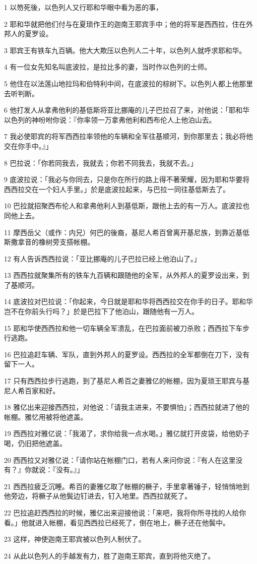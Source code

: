 \par 1 以笏死後，以色列人又行耶和华眼中看为恶的事，
\par 2 耶和华就把他们付与在夏琐作王的迦南王耶宾手中；他的将军是西西拉，住在外邦人的夏罗设。
\par 3 耶宾王有铁车九百辆。他大大欺压以色列人二十年，以色列人就呼求耶和华。
\par 4 有一位女先知名叫底波拉，是拉比多的妻，当时作以色列的士师。
\par 5 他住在以法莲山地拉玛和伯特利中间，在底波拉的棕树下。以色列人都上他那里去听判断。
\par 6 他打发人从拿弗他利的基低斯将亚比挪庵的儿子巴拉召了来，对他说：「耶和华以色列的神吩咐你说：『你率领一万拿弗他利和西布伦人上他泊山去。
\par 7 我必使耶宾的将军西西拉率领他的车辆和全军往基顺河，到你那里去；我必将他交在你手中。』」
\par 8 巴拉说：「你若同我去，我就去；你若不同我去，我就不去。」
\par 9 底波拉说：「我必与你同去，只是你在所行的路上得不著荣耀，因为耶和华要将西西拉交在一个妇人手里。」於是底波拉起来，与巴拉一同往基低斯去了。
\par 10 巴拉就招聚西布伦人和拿弗他利人到基低斯，跟他上去的有一万人。底波拉也同他上去。
\par 11 摩西岳父（或作：内兄）何巴的後裔，基尼人希百曾离开基尼族，到靠近基低斯撒拿音的橡树旁支搭帐棚。
\par 12 有人告诉西西拉说：「亚比挪庵的儿子巴拉已经上他泊山了。」
\par 13 西西拉就聚集所有的铁车九百辆和跟随他的全军，从外邦人的夏罗设出来，到了基顺河。
\par 14 底波拉对巴拉说：「你起来，今日就是耶和华将西西拉交在你手的日子。耶和华岂不在你前头行吗？」於是巴拉下了他泊山，跟随他有一万人。
\par 15 耶和华使西西拉和他一切车辆全军溃乱，在巴拉面前被刀杀败；西西拉下车步行逃跑。
\par 16 巴拉追赶车辆、军队，直到外邦人的夏罗设。西西拉的全军都倒在刀下，没有留下一人。
\par 17 只有西西拉步行逃跑，到了基尼人希百之妻雅亿的帐棚，因为夏琐王耶宾与基尼人希百家和好。
\par 18 雅亿出来迎接西西拉，对他说：「请我主进来，不要惧怕」；西西拉就进了他的帐棚。雅忆用被将他遮盖。
\par 19 西西拉对雅亿说：「我渴了，求你给我一点水喝。」雅亿就打开皮袋，给他奶子喝，仍旧把他遮盖。
\par 20 西西拉又对雅亿说：「请你站在帐棚门口，若有人来问你说：『有人在这里没有？』你就说：『没有。』」
\par 21 西西拉疲乏沉睡。希百的妻雅亿取了帐棚的橛子，手里拿著锤子，轻悄悄地到他旁边，将橛子从他鬓边钉进去，钉入地里。西西拉就死了。
\par 22 巴拉追赶西西拉的时候，雅亿出来迎接他说：「来吧，我将你所寻找的人给你看。」他就进入帐棚，看见西西拉已经死了，倒在地上，橛子还在他鬓中。
\par 23 这样，神使迦南王耶宾被以色列人制伏了。
\par 24 从此以色列人的手越发有力，胜了迦南王耶宾，直到将他灭绝了。

